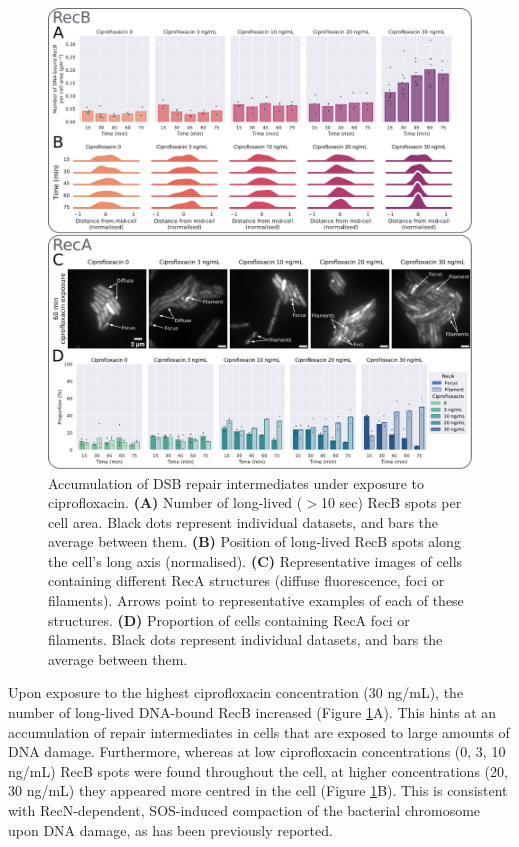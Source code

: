\begin{figure}[htbp]
    \centering
    \includegraphics[width=\textwidth]{Figures/Fig4_cipro_30ngmL.pdf}
    \caption{Accumulation of DSB repair intermediates under exposure to ciprofloxacin. \textbf{(A)} Number of long-lived ($>$10 sec) RecB spots per cell area. Black dots represent individual datasets, and bars the average between them. \textbf{(B)} Position of long-lived RecB spots along the cell's long axis (normalised). \textbf{(C)} Representative images of cells containing different RecA structures (diffuse fluorescence, foci or filaments). Arrows point to representative examples of each of these structures. \textbf{(D)} Proportion of cells containing RecA foci or filaments. Black dots represent individual datasets, and bars the average between them.}
    \label{Fig:high_cipro}
\end{figure}

Upon exposure to the highest cipro\-floxacin concentration (30 ng/mL), the number of long-lived DNA-bound RecB increased (Figure \ref{Fig:high_cipro}A). This hints at an accumulation of repair intermediates in cells that are exposed to large amounts of DNA damage. Furthermore, whereas at low ciprofloxacin concentrations (0, 3, 10 ng/mL) RecB spots were found throughout the cell, at higher concentrations (20, 30 ng/mL) they appeared more centred in the cell (Figure \ref{Fig:high_cipro}B). This is consistent with RecN-dependent, SOS-induced compaction of the bacterial chromosome upon DNA damage, as has been previously reported\cite{Odsbu2014}.

